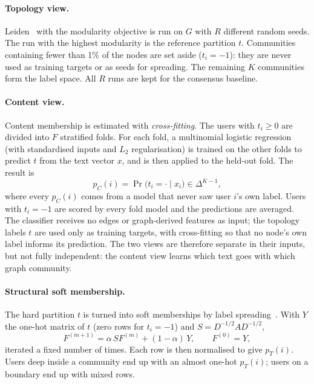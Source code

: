 \paragraph{Topology view.}
Leiden~\citep{traag2019leiden} with the modularity objective is run on $G$ with $R$
different random seeds. The run with the highest modularity is the reference partition
$t$. Communities containing fewer than 1\% of the nodes are set aside ($t_i=-1$): they
are never used as training targets or as seeds for spreading. The remaining $K$
communities form the label space. All $R$ runs are kept for the consensus baseline.

\paragraph{Content view.}
Content membership is estimated with \emph{cross-fitting}. The users with $t_i \ge 0$
are divided into $F$ stratified folds. For each fold, a multinomial logistic
regression (with standardised inputs and $L_2$ regularisation) is trained on the other
folds to predict $t$ from the text vector $x$, and is then applied to the held-out
fold. The result is
\begin{equation}
  p_C(i) = \Pr\bigl(t_i = \cdot \mid x_i\bigr) \in \Delta^{K-1},
\end{equation}
where every $p_C(i)$ comes from a model that never saw user $i$'s own label. Users with
$t_i=-1$ are scored by every fold model and the predictions are averaged. The
classifier receives no edges or graph-derived features as input; the topology labels
$t$ are used only as training targets, with cross-fitting so that no node's own label
informs its prediction. The two views are therefore separate in their inputs, but not
fully independent: the content view learns which text goes with which graph
community.

\paragraph{Structural soft membership.}
The hard partition $t$ is turned into soft memberships by label
spreading~\citep{zhou2004learning}. With $Y$ the one-hot matrix of $t$ (zero rows for
$t_i=-1$) and $S = D^{-1/2} A D^{-1/2}$,
\begin{equation}
  F^{(m+1)} = \alpha\, S F^{(m)} + (1-\alpha)\, Y, \qquad F^{(0)} = Y,
\end{equation}
iterated a fixed number of times. Each row is then normalised to give $p_T(i)$. Users
deep inside a community end up with an almost one-hot $p_T(i)$; users on a boundary
end up with mixed rows.

